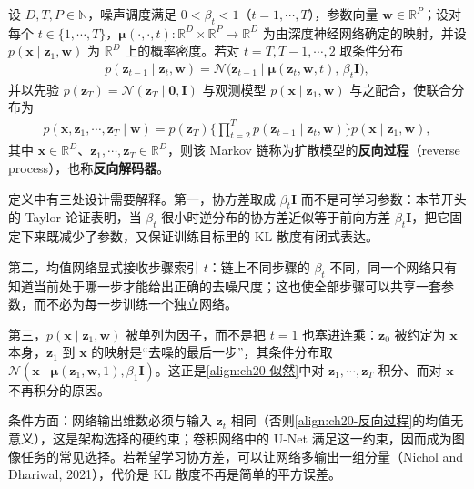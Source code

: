 \documentclass[../../main.tex]{subfiles}
\begin{document}
\begin{definition}[反向过程]\label{definition:ch20-反向过程}
设 $D,T,P\in\mathbb{N}$，噪声调度满足 $0<\beta_t<1$（$t=1,\cdots,T$），参数向量 $\bm{w}\in\mathbb{R}^{P}$；设对每个 $t\in\{1,\cdots,T\}$，$\bm{\mu}(\cdot,\cdot,t):\mathbb{R}^{D}\times\mathbb{R}^{P}\to\mathbb{R}^{D}$ 为由深度神经网络确定的映射，并设 $p(\bm{x}\mid\bm{z}_1,\bm{w})$ 为 $\mathbb{R}^{D}$ 上的概率密度。若对 $t=T,T-1,\cdots,2$ 取条件分布
\begin{align}
p(\bm{z}_{t-1}\mid\bm{z}_t,\bm{w})=\mathcal{N}\big(\bm{z}_{t-1}\mid\bm{\mu}(\bm{z}_t,\bm{w},t),\,\beta_t\bm{I}\big),
\label{align:ch20-反向过程}
\end{align}
并以先验 $p(\bm{z}_T)=\mathcal{N}(\bm{z}_T\mid\bm{0},\bm{I})$ 与观测模型 $p(\bm{x}\mid\bm{z}_1,\bm{w})$ 与之配合，使联合分布为
\begin{align}
p(\bm{x},\bm{z}_1,\cdots,\bm{z}_T\mid\bm{w})=p(\bm{z}_T)\Big\{\prod_{t=2}^{T}p(\bm{z}_{t-1}\mid\bm{z}_t,\bm{w})\Big\}p(\bm{x}\mid\bm{z}_1,\bm{w}),
\label{align:ch20-反向联合}
\end{align}
其中 $\bm{x}\in\mathbb{R}^{D}$、$\bm{z}_1,\cdots,\bm{z}_T\in\mathbb{R}^{D}$，则该 Markov 链称为扩散模型的\textbf{反向过程}（reverse process），也称\textbf{反向解码器}。
\end{definition}

\begin{remark}
定义中有三处设计需要解释。第一，协方差取成 $\beta_t\bm{I}$ 而不是可学习参数：本节开头的 Taylor 论证表明，当 $\beta_t$ 很小时逆分布的协方差近似等于前向方差 $\beta_t\bm{I}$，把它固定下来既减少了参数，又保证训练目标里的 KL 散度有闭式表达。\par
第二，均值网络显式接收步骤索引 $t$：链上不同步骤的 $\beta_t$ 不同，同一个网络只有知道当前处于哪一步才能给出正确的去噪尺度；这也使全部步骤可以共享一套参数，而不必为每一步训练一个独立网络。\par
第三，$p(\bm{x}\mid\bm{z}_1,\bm{w})$ 被单列为因子，而不是把 $t=1$ 也塞进连乘：$\bm{z}_0$ 被约定为 $\bm{x}$ 本身，$\bm{z}_1$ 到 $\bm{x}$ 的映射是“去噪的最后一步”，其条件分布取 $\mathcal{N}(\bm{x}\mid\bm{\mu}(\bm{z}_1,\bm{w},1),\beta_1\bm{I})$。这正是\eqref{align:ch20-似然}中对 $\bm{z}_1,\cdots,\bm{z}_T$ 积分、而对 $\bm{x}$ 不再积分的原因。\par
条件方面：网络输出维数必须与输入 $\bm{z}_t$ 相同（否则\eqref{align:ch20-反向过程}的均值无意义），这是架构选择的硬约束；卷积网络中的 U-Net 满足这一约束，因而成为图像任务的常见选择。若希望学习协方差，可以让网络多输出一组分量（Nichol and Dhariwal, 2021），代价是 KL 散度不再是简单的平方误差。
\end{remark}
\end{document}
